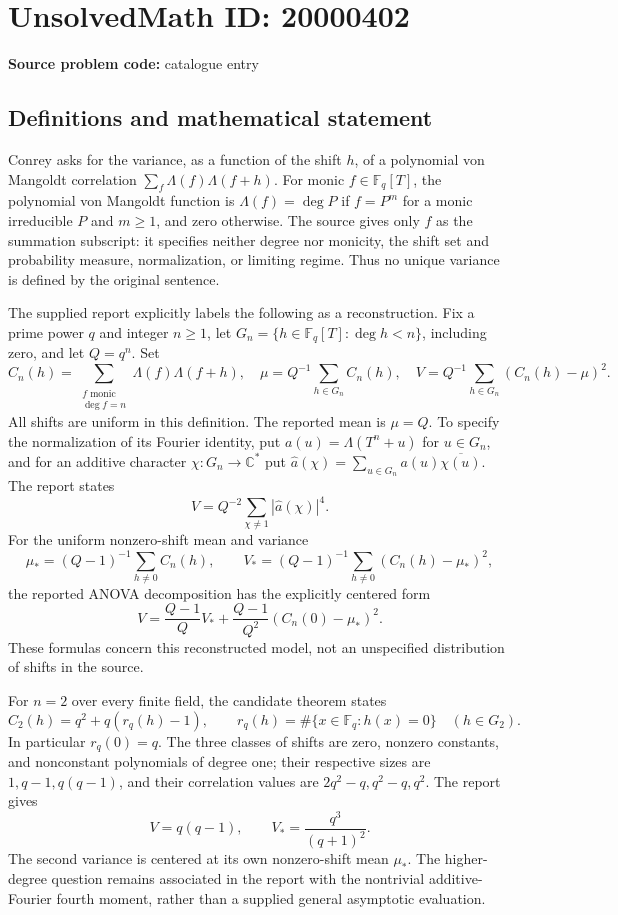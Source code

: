 \documentclass[11pt]{article}
\newcommand{\C}{\mathbb{C}}
\newcommand{\F}{\mathbb{F}}
\begin{document}
\section*{UnsolvedMath ID: 20000402}
\textbf{Source problem code:} catalogue entry
\subsection{Definitions and mathematical statement}
Conrey asks for the variance, as a function of the shift \(h\), of a polynomial von Mangoldt correlation \(\sum_f\Lambda(f)\Lambda(f+h)\). For monic \(f\in\F_q[T]\), the polynomial von Mangoldt function is \(\Lambda(f)=\deg P\) if \(f=P^m\) for a monic irreducible \(P\) and \(m\ge1\), and zero otherwise. The source gives only \(f\) as the summation subscript: it specifies neither degree nor monicity, the shift set and probability measure, normalization, or limiting regime. Thus no unique variance is defined by the original sentence.

The supplied report explicitly labels the following as a reconstruction. Fix a prime power \(q\) and integer \(n\ge1\), let \(G_n=\{h\in\F_q[T]:\deg h<n\}\), including zero, and let \(Q=q^n\). Set
\[
 C_n(h)=\sum_{\substack{f\text{ monic}\\\deg f=n}}\Lambda(f)\Lambda(f+h),\quad
 \mu=Q^{-1}\sum_{h\in G_n}C_n(h),\quad
 V=Q^{-1}\sum_{h\in G_n}(C_n(h)-\mu)^2.
\]
All shifts are uniform in this definition. The reported mean is \(\mu=Q\). To specify the normalization of its Fourier identity, put \(a(u)=\Lambda(T^n+u)\) for \(u\in G_n\), and for an additive character \(\chi:G_n\to\C^*\) put \(\widehat a(\chi)=\sum_{u\in G_n}a(u)\overline{\chi(u)}\). The report states
\[
 V=Q^{-2}\sum_{\chi\ne1}|\widehat a(\chi)|^4.
\]
For the uniform nonzero-shift mean and variance
\[
 \mu_*=(Q-1)^{-1}\sum_{h\ne0}C_n(h),\qquad
 V_*=(Q-1)^{-1}\sum_{h\ne0}(C_n(h)-\mu_*)^2,
\]
the reported ANOVA decomposition has the explicitly centered form
\[
 V=\frac{Q-1}{Q}V_*+
 \frac{Q-1}{Q^2}(C_n(0)-\mu_*)^2.
\]
These formulas concern this reconstructed model, not an unspecified distribution of shifts in the source.

For \(n=2\) over every finite field, the candidate theorem states
\[
 C_2(h)=q^2+q(r_q(h)-1),\qquad
 r_q(h)=\#\{x\in\F_q:h(x)=0\}\quad(h\in G_2).
\]
In particular \(r_q(0)=q\). The three classes of shifts are zero, nonzero constants, and nonconstant polynomials of degree one; their respective sizes are \(1,q-1,q(q-1)\), and their correlation values are \(2q^2-q,q^2-q,q^2\). The report gives
\[
 V=q(q-1),\qquad V_*=\frac{q^3}{(q+1)^2}.
\]
The second variance is centered at its own nonzero-shift mean \(\mu_*\). The higher-degree question remains associated in the report with the nontrivial additive-Fourier fourth moment, rather than a supplied general asymptotic evaluation.
\end{document}
